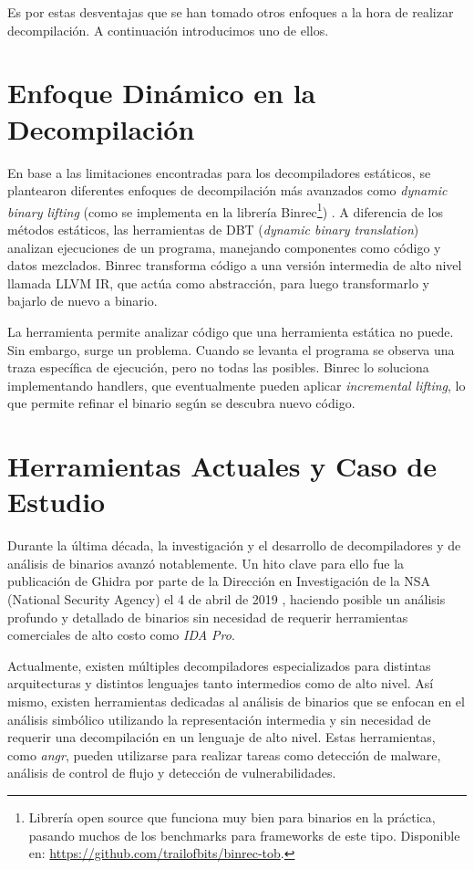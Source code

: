\documentclass[runningheads]{llncs}
\begin{document}
Es por estas desventajas que se han tomado otros enfoques a la hora de realizar decompilación. 
A continuación introducimos uno de ellos.

\section{Enfoque Dinámico en la Decompilación}
En base a las limitaciones encontradas para los decompiladores estáticos, se plantearon diferentes 
enfoques de decompilación más avanzados como \textit{dynamic binary lifting} (como se implementa 
en la librería Binrec\footnote{Librería open source que funciona muy bien para binarios en la 
práctica, pasando muchos de los benchmarks para frameworks de este tipo. 
Disponible en: \url{https://github.com/trailofbits/binrec-tob}.}) \cite{binrec}. A diferencia de 
los métodos estáticos, las herramientas de DBT (\textit{dynamic binary translation}) analizan ejecuciones 
de un programa, manejando componentes como código y datos mezclados. Binrec transforma código 
a una versión intermedia de alto nivel llamada LLVM IR, que actúa como abstracción, para 
luego transformarlo y bajarlo de nuevo a binario.

La herramienta permite analizar código que una herramienta estática no puede. Sin embargo, 
surge un problema. Cuando se levanta el programa se observa una traza específica de ejecución, 
pero no todas las posibles. Binrec lo soluciona implementando handlers, que eventualmente pueden 
aplicar \textit{incremental lifting}, lo que permite refinar el binario según se descubra nuevo código.

\section{Herramientas Actuales y Caso de Estudio}
Durante la última década, la investigación y el desarrollo de decompiladores y de análisis de binarios 
avanzó notablemente. Un hito clave para ello fue la publicación de Ghidra por parte de 
la Dirección en Investigación de la NSA (National Security Agency) el 4 de abril de 2019 \cite{ghidra-book},
haciendo posible un análisis profundo y detallado de binarios sin necesidad de requerir herramientas 
comerciales de alto costo como \textit{IDA Pro}.

Actualmente, existen múltiples decompiladores especializados para distintas arquitecturas y distintos 
lenguajes tanto intermedios como de alto nivel. Así mismo, existen herramientas dedicadas al análisis 
de binarios que se enfocan en el análisis simbólico utilizando la representación intermedia y sin 
necesidad de requerir una decompilación en un lenguaje de alto nivel. Estas herramientas, como 
\textit{angr}, pueden utilizarse para realizar tareas como detección de malware, análisis de control 
de flujo y detección de vulnerabilidades.
\end{document}

